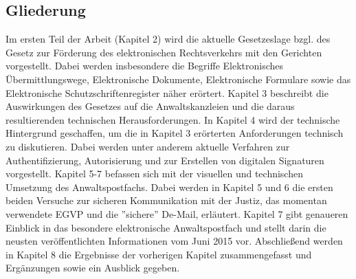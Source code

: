 \subsection{Gliederung}
Im ersten Teil der Arbeit (Kapitel 2) wird die aktuelle Gesetzeslage bzgl. des Gesetz zur Förderung des elektronischen Rechtsverkehrs mit den Gerichten vorgestellt. Dabei werden insbesondere die Begriffe  Elektronisches Übermittlungswege, Elektronische Dokumente, Elektronische Formulare sowie das Elektronische Schutzschriftenregister näher erörtert. Kapitel 3 beschreibt die Auswirkungen des Gesetzes auf die Anwaltskanzleien und die daraus resultierenden technischen Herausforderungen. In Kapitel 4 wird der technische Hintergrund geschaffen, um die in Kapitel 3 erörterten Anforderungen technisch zu diskutieren. Dabei werden unter anderem aktuelle Verfahren zur Authentifizierung, Autorisierung und zur Erstellen von digitalen Signaturen vorgestellt. Kapitel 5-7 befassen sich mit der visuellen und technischen Umsetzung des Anwaltspostfachs. Dabei werden in Kapitel 5 und 6 die ersten beiden Versuche zur sicheren Kommunikation mit der Justiz, das momentan verwendete EGVP und die ''sichere'' De-Mail, erläutert. Kapitel 7 gibt genaueren Einblick in das besondere elektronische Anwaltspostfach und stellt darin die neusten veröffentlichten Informationen vom Juni 2015 vor. Abschließend werden in Kapitel 8 die Ergebnisse der vorherigen Kapitel zusammengefasst und Ergänzungen sowie ein Ausblick gegeben.

